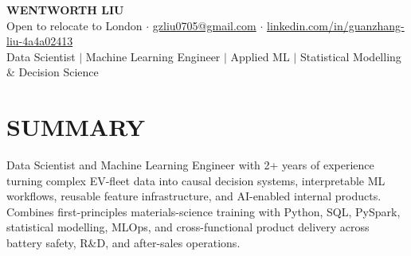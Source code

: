 \documentclass[a4paper,10pt]{article}
\begin{document}
\fontsize{8.8pt}{10.0pt}\selectfont
\begin{center}
{\Large\bfseries WENTWORTH LIU}\\[2pt]
{\small Open to relocate to London \;$\cdot$\; \href{mailto:gzliu0705@gmail.com}{gzliu0705@gmail.com} \;$\cdot$\; \href{https://www.linkedin.com/in/guanzhang-liu-4a4a02413}{linkedin.com/in/guanzhang-liu-4a4a02413}}\\[2pt]
{\small Data Scientist \;$\vert$\; Machine Learning Engineer \;$\vert$\; Applied ML \;$\vert$\; Statistical Modelling \& Decision Science}
\end{center}
\vspace{-3pt}
\section{SUMMARY}
Data Scientist and Machine Learning Engineer with 2+ years of experience turning complex EV-fleet data into causal decision systems, interpretable ML workflows, reusable feature infrastructure, and AI-enabled internal products. Combines first-principles materials-science training with Python, SQL, PySpark, statistical modelling, MLOps, and cross-functional product delivery across battery safety, R\&D, and after-sales operations.
\end{document}
